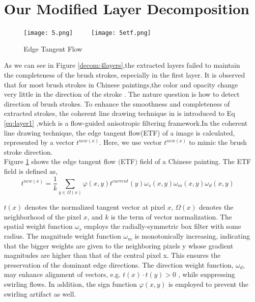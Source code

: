 \section{Our Modified Layer Decomposition}
\begin{figure}[H]
	\centering
	\texttt{[image: 5.png]}
	~~~~
	\texttt{[image: 5etf.png]}
	\caption{Edge Tangent Flow}
	\label{ETF}
\end{figure}

As we can see in Figure \ref{decom:4layers},the extracted layers failed to maintain the completeness of the brush strokes, especially in the first layer. 
It is observed that for most brush strokes in Chinese paintings,the color and opacity change very little in the direction of the stroke \cite{xu2006animating}. The nature question is how to detect direction of brush strokes. 
To enhance the smoothness and completeness of extracted strokes, the coherent line drawing technique in \cite{kang2007coherent} is introduced to Eq \ref{eq:layer1} ,which is a flow-guided anisotropic filtering framework.In the coherent line drawing technique, the edge tangent flow(ETF) of a image is calculated, represented by a vector $t^{new(x)} $. Here, we use vector $t^{new(x)} $ to mimic the brush stroke direction. \\
Figure \ref{ETF} shows the edge tangent flow $($ETF$)$ field of a Chinese painting.\newline
The ETF field is defined as,
\begin{equation}
 t^{new(x)}=\frac{1}{k}\sum_{y\in\Omega(x)} \varphi(x,y)t^{current}(y)\omega_{s}(x,y)\omega_{m}(x,y)\omega_{d}(x,y)
 \label{eq:layer_etf} 
\end{equation}

$t(x)$ denotes the normalized tangent vector at pixel $x$, $\Omega(x)$ denotes the neighborhood of the pixel $x$, and $k$ is the term of vector normalization. The spatial weight function $\omega_{s}$ employs the radially-symmetric box filter with some radius. The magnitude weight function $\omega_{m}$ is monotonically increasing, indicating that the bigger weights are given to the neighboring pixels y whose gradient magnitudes are higher than that of the central pixel x. This ensures the preservation of the dominant edge directions. The direction weight function, $\omega_{d}$, may enhance alignment of vectors, e.g. $t(x)\cdot t(y)>0$ , while suppressing swirling flows. In addition, the sign function $\varphi(x,y)$  is employed to prevent the swirling artifact as well.

